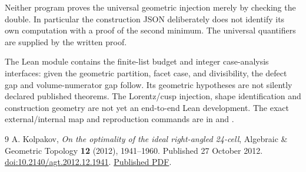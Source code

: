 \documentclass[11pt]{article}
\begin{document}
Neither program proves the universal geometric injection merely by
checking the double. In particular the construction JSON deliberately
does not identify its own computation with a proof of the second
minimum. The universal quantifiers are supplied by the written proof.

The Lean module  contains
the finite-list budget and integer case-analysis interfaces: given
the geometric partition, facet case, and divisibility, the defect gap
and volume-numerator gap follow. Its geometric hypotheses are not
silently declared published theorems. The Lorentz/cusp injection,
shape identification and construction geometry are not yet an
end-to-end Lean development. The exact external/internal map and
reproduction commands are in
 and
.

\begin{thebibliography}{9}
 A. Kolpakov, \emph{On the optimality of the ideal
right-angled 24-cell}, Algebraic \& Geometric Topology \textbf{12}
(2012), 1941--1960. Published 27 October 2012.
\href{https://doi.org/10.2140/agt.2012.12.1941}{doi:10.2140/agt.2012.12.1941}.
\href{https://msp.org/agt/2012/12-4/agt-v12-n4-p03-s.pdf}{Published PDF}.
\end{thebibliography}
\end{document}
